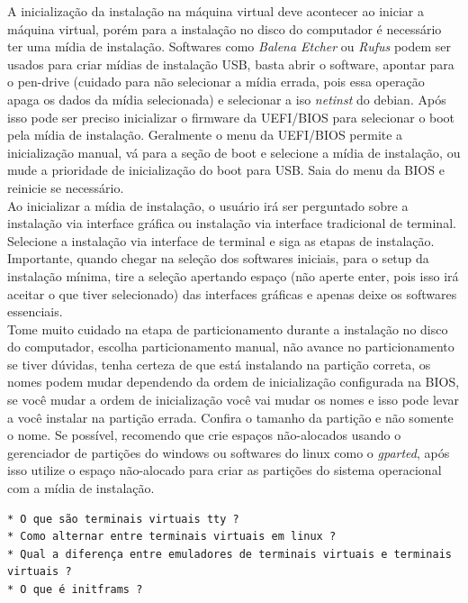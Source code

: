 \documentclass[12pt,a4paper]{article}
\begin{document}
\vspace{\baselineskip}

A inicialização da instalação na máquina virtual deve acontecer ao iniciar a máquina virtual, porém para a instalação no disco do computador é necessário ter uma mídia de instalação. Softwares como \textit{Balena Etcher} ou \textit{Rufus} podem ser usados para criar mídias de instalação USB, basta abrir o software, apontar para o pen-drive (cuidado para não selecionar a mídia errada, pois essa operação apaga os dados da mídia selecionada) e selecionar a iso \textit{netinst} do debian. Após isso pode ser preciso inicializar o firmware da UEFI/BIOS para selecionar o boot pela mídia de instalação. Geralmente o menu da UEFI/BIOS permite a inicialização manual, vá para a seção de boot e selecione a mídia de instalação, ou mude a prioridade de inicialização do boot para USB. Saia do menu da BIOS e reinicie se necessário. \\ 

Ao inicializar a mídia de instalação, o usuário irá ser perguntado sobre a instalação via interface gráfica ou instalação via interface tradicional de terminal. Selecione a instalação via interface de terminal e siga as etapas de instalação. Importante, quando chegar na seleção dos softwares iniciais, para o setup da instalação mínima, tire a seleção apertando espaço (não aperte enter, pois isso irá aceitar o que tiver selecionado) das interfaces gráficas e apenas deixe os softwares essenciais. \\

Tome muito cuidado na etapa de particionamento durante a instalação no disco do computador, escolha particionamento manual, não avance no particionamento se tiver dúvidas, tenha certeza de que está instalando na partição correta, os nomes podem mudar dependendo da ordem de inicialização configurada na BIOS, se você mudar a ordem de inicialização você vai mudar os nomes e isso pode levar a você instalar na partição errada. Confira o tamanho da partição e não somente o nome. Se possível, recomendo que crie espaços não-alocados usando o gerenciador de partições do windows ou softwares do linux como o \textit{gparted}, após isso utilize o espaço não-alocado para criar as partições do sistema operacional com a mídia de instalação.\\

\begin{lstlisting}
* O que são terminais virtuais tty ?
* Como alternar entre terminais virtuais em linux ?
* Qual a diferença entre emuladores de terminais virtuais e terminais virtuais ?
* O que é initframs ? 
\end{lstlisting}
\end{document}
